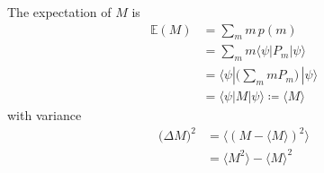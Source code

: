 \documentclass{article}
\newcounter{definition}[section]
\begin{document}
      \begin{definition}
        \label{def:expection-variance-of-observable}
        The expectation of $M$ is
        \begin{align*}
          \mathbb{E}(M) & = \sum_m m\, p(m) \\
          & = \sum_m m \langle \psi | P_m | \psi \rangle \\
          & = \langle \psi | \bigg( \sum_m m P_m \bigg) \, | \psi \rangle \\
          & = \langle \psi | M | \psi \rangle \coloneqq \langle M \rangle
        \end{align*}
        with variance
        \begin{align*}
          \big( \Delta M\big)^2 & = \langle (M - \langle M \rangle )^2 \rangle \\
          & = \langle M^2 \rangle - \langle M \rangle^2
        \end{align*} 
      \end{definition}
\end{document}
